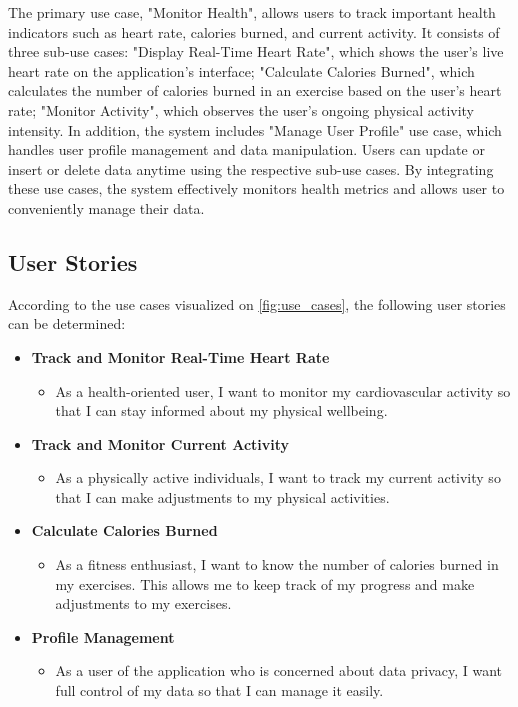 The primary use case, "Monitor Health", allows users to track important health indicators such as heart rate, calories burned, and current activity. It consists of three sub-use cases: "Display Real-Time Heart Rate", which shows the user's live heart rate on the application's interface; "Calculate Calories Burned", which calculates the number of calories burned in an exercise based on the user's heart rate;  "Monitor Activity", which observes the user's ongoing physical activity intensity. In addition, the system includes "Manage User Profile" use case, which handles user profile management and data manipulation. Users can update or insert or delete data anytime using the respective sub-use cases. By integrating these use cases, the system effectively monitors health metrics and allows user to conveniently manage their data.

\subsection{User Stories}
\label{chap:user_stories}
According to the use cases visualized on \autoref{fig:use_cases}, the following user stories can be determined:

\begin{itemize}[label={},leftmargin=*]
    \item \textbf{Track and Monitor Real-Time Heart Rate}
      \begin{itemize}[label={},leftmargin=*]
        \item As a health-oriented user, I want to monitor my cardiovascular activity so that I can stay informed about my physical wellbeing.
      \end{itemize}

    \item \textbf{Track and Monitor Current Activity}
      \begin{itemize}[label={},leftmargin=*]
        \item As a physically active individuals, I want to track my current activity so that I can make adjustments to my physical activities.
      \end{itemize}

    \item \textbf{Calculate Calories Burned}
      \begin{itemize}[label={},leftmargin=*]
        \item As a fitness enthusiast, I want to know the number of calories burned in my exercises. This allows me to keep track of my progress and make adjustments to my exercises.
      \end{itemize}  

    \item \textbf{Profile Management}
      \begin{itemize}[label={},leftmargin=*]
        \item As a user of the application who is concerned about data privacy, I want full control of my data so that I can manage it easily. 
      \end{itemize}
  \end{itemize}


